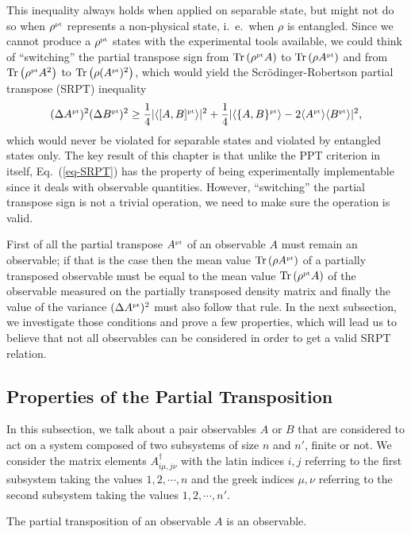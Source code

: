 This inequality always holds when applied on separable state, but might not do so when $\rho^{\mbox{\tiny \textup{pt}}}$ represents a non-physical state, i.~e.~when $\rho$ is entangled. Since we cannot produce a $\rho^{\mbox{\tiny \textup{pt}}}$ states with the experimental tools available, we could think of ``switching'' the partial transpose sign from $ \mbox{\textup{Tr}}\left( \rho^{\mbox{\tiny \textup{pt}}} A \right)$ to $ \mbox{\textup{Tr}}\left(  \rho A^{\mbox{\tiny \textup{pt}}} \right)$ and from $\mbox{\textup{Tr}}\left( \rho^{\mbox{\tiny \textup{pt}}} A^2 \right)$ to $\mbox{\textup{Tr}}\left(  \rho (A^{\mbox{\tiny \textup{pt}}})^2 \right)$, which would yield the Scr\"odinger-Robertson partial transpose (SRPT) inequality
\[  (\Delta A^{\mbox{\tiny \textup{pt}}})^2 (\Delta B^{\mbox{\tiny \textup{pt}}})^2 \ge \frac{1}{4} | \langle [A,B]^{\mbox{\tiny \textup{pt}}} \rangle |^2  +  \frac{1}{4} | \langle \{ A,B \}^{\mbox{\tiny \textup{pt}}} \rangle  - 2 \langle A^{\mbox{\tiny \textup{pt}}} \rangle \langle B^{\mbox{\tiny \textup{pt}}} \rangle |^2 , \label{eq-SRPT} \]
which would never be violated for separable states and violated by entangled states only. The key result of this chapter is that unlike the PPT criterion in itself, Eq.~(\ref{eq-SRPT}) has the property of being experimentally implementable since it deals with observable quantities. However, ``switching'' the partial transpose sign is not a trivial operation, we need to make sure the operation is valid.

First of all the partial transpose $A^{\mbox{\tiny \textup{pt}}}$ of an observable $A$ must remain an observable; if that is the case then the mean value $ \mbox{\textup{Tr}}\left( \rho A^{\mbox{\tiny \textup{pt}}} \right)$ of a partially transposed observable must be equal to the mean value $ \mbox{\textup{Tr}}\left( \rho^{\mbox{\tiny \textup{pt}}} A \right)$ of the observable measured on the partially transposed density matrix and finally the value of the variance $(\Delta A^{\mbox{\tiny \textup{pt}}})^2$ must also follow that rule. In the next subsection, we investigate those conditions and prove a few properties, which will lead us to believe that not all observables can be considered in order to get a valid SRPT relation.

\subsection{Properties of the Partial Transposition}

In this subsection, we talk about a pair observables $A$ or $B$ that are considered to act on a system composed of two subsystems of size $n$ and $n'$, finite or not. We consider the matrix elements $A^\dagger_{i\mu,j\nu}$ with the latin indices $i,j$ referring to the first subsystem taking the values $1,2,\cdots,n$ and the greek indices $\mu,\nu$ referring to the second subsystem taking the values $1,2,\cdots,n'$.

\setcounter{prop}{0}

\begin{prop} \label{prop-herm}
  The partial transposition of an observable $A$ is an observable.
\end{prop}

